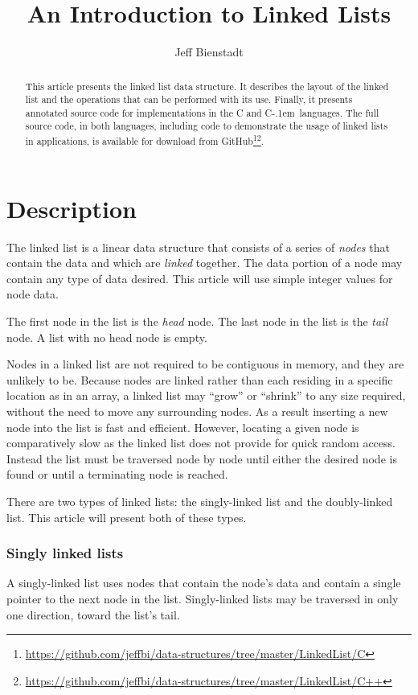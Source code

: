 \documentclass{article}
\newcommand{\Cpp}{\mbox{C\kern-.1em\raisebox{.35ex}{\smaller{\smaller{+\kern-0.05em+}}}}}
\begin{document}
  \title{An Introduction to Linked Lists}
  \author{Jeff Bienstadt}
  \maketitle
  \begin{abstract}
    This article presents the linked list data structure. It describes the layout of the linked list and the operations that can be performed with its use. Finally, it presents annotated source code for implementations in the C and \Cpp\ languages. The full source code, in both languages, including code to demonstrate the usage of linked lists in applications, is available for download from GitHub\footnote{\url{https://github.com/jeffbi/data-structures/tree/master/LinkedList/C}}\footnote{\url{https://github.com/jeffbi/data-structures/tree/master/LinkedList/C++}}.
  \end{abstract}
  \part{Description}
  The linked list is a linear data structure that consists of a series of \emph{nodes} that contain the data and which are \emph{linked} together. The data portion of a node may contain any type of data desired. This article will use simple integer values for node data.

  The first node in the list is the \emph{head} node. The last node in the list is the \emph{tail} node. A list with no head node is empty.

  Nodes in a linked list are not required to be contiguous in memory, and they are unlikely to be. Because nodes are linked rather than each residing in a specific location as in an array, a linked list may ``grow'' or ``shrink'' to any size required, without the need to move any surrounding nodes. As a result inserting a new node into the list is fast and efficient. However, locating a given node is comparatively slow as the linked list does not provide for quick random access. Instead the list must be traversed node by node until either the desired node is found or until a terminating node is reached.

  There are two types of linked lists: the singly-linked list and the doubly-linked list. This article will present both of these types.
  \section{Singly linked lists}
  A singly-linked list uses nodes that contain the node's data and contain a single pointer to the next node in the list. Singly-linked lists may be traversed in only one direction, toward the list's tail.
\end{document}
